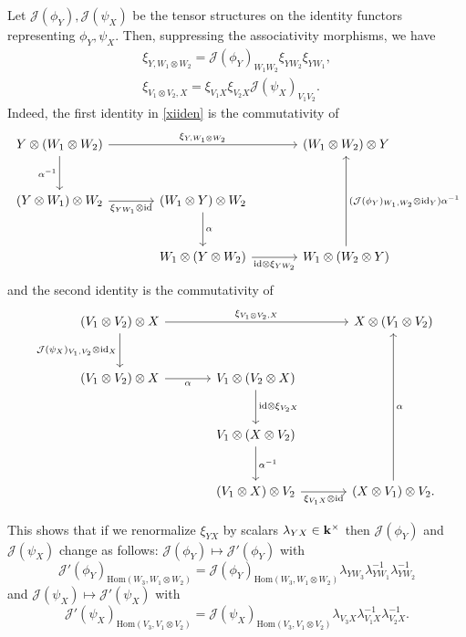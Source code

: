 \documentclass[12pt]{amsart}
\numberwithin{equation}{section}
\theoremstyle{definition}
\newcommand{\id}{\text{id}}
\newcommand{\Hom}{\text{Hom}}
\newcommand{\1}{_{(1)}}
\newcommand{\2}{_{(2)}}
\newcommand{\3}{_{(3)}}
\newcommand{\4}{_{(4)}}
\newcommand{\5}{_{(5)}}
\newcommand{\6}{_{(6)}}
\theoremstyle{plain}
\theoremstyle{definition}
\theoremstyle{remark}
\def\Hom{\mathrm{Hom}}
\begin{document}
Let $\mathcal J(\phi_Y),\mathcal J(\psi_X)$ be the tensor structures on the identity functors representing $\phi_Y,\psi_X$. 
Then, suppressing the associativity morphisms, we have
\begin{equation} \label{xiiden}
\begin{aligned} 
\xi_{Y,W_1\otimes W_2}=\mathcal J(\phi_Y)_{W_1W_2}\xi_{YW_2}\xi_{YW_1},\\
\xi_{V_1\otimes V_2,X}=\xi_{V_1X}\xi_{V_2X}\mathcal J(\psi_X)_{V_1V_2}.
\end{aligned}
\end{equation}
Indeed, the first identity in \eqref{xiiden} is the commutativity of
\[
\begin{tikzcd}[column sep=large,row sep=large]
Y\otimes (W_1\otimes W_2) \arrow[rr,"{\xi_{Y,W_1\otimes W_2}}"] \arrow[d,"{\alpha^{-1}}"'] && (W_1\otimes W_2)\otimes Y \\
(Y\otimes W_1)\otimes W_2 \arrow[r,"{\xi_{YW_1}\otimes\id}"'] & (W_1\otimes Y)\otimes W_2 \arrow[d,"{\alpha}"] & \\
& W_1\otimes (Y\otimes W_2) \arrow[r,"{\id\otimes\xi_{YW_2}}"'] & W_1\otimes (W_2\otimes Y) \arrow[uu,"{(\mathcal J(\phi_Y)_{W_1,W_2}\otimes\id_Y)\alpha^{-1}}"']
\end{tikzcd}
\]
and the second identity is the commutativity of
\[
\begin{tikzcd}[column sep=large,row sep=large]
(V_1\otimes V_2)\otimes X \arrow[rr,"{\xi_{V_1\otimes V_2,X}}"] \arrow[d,"{\mathcal J(\psi_X)_{V_1,V_2}\otimes\id_X}"'] && X\otimes (V_1\otimes V_2) \\
(V_1\otimes V_2)\otimes X \arrow[r,"{\alpha}"'] & V_1\otimes (V_2\otimes X) \arrow[d,"{\id\otimes\xi_{V_2X}}"] & \\
& V_1\otimes (X\otimes V_2) \arrow[d,"{\alpha^{-1}}"] & \\
& (V_1\otimes X)\otimes V_2 \arrow[r,"{\xi_{V_1X}\otimes\id}"'] & (X\otimes V_1)\otimes V_2 \arrow[uuu,"{\alpha}"'].
\end{tikzcd}
\]

This shows that if we renormalize $\xi_{YX}$ by scalars $\lambda_{YX}\in \bold k^\times$ 
then $\mathcal J(\phi_Y)$ and $\mathcal J(\psi_X)$ change as follows: 
$\mathcal J(\phi_Y)\mapsto \mathcal J'(\phi_Y)$ with 
\begin{equation}\label{tran1} 
\mathcal J'(\phi_Y)_{\Hom(W_3,W_1\otimes W_2)}=\mathcal J(\phi_Y)_{\Hom(W_3,W_1\otimes W_2)}\lambda_{YW_3}\lambda_{YW_1}^{-1}\lambda_{YW_2}^{-1}
\end{equation}
and 
$\mathcal J(\psi_X)\mapsto \mathcal J'(\psi_X)$ with 
\begin{equation}\label{tran2} 
\mathcal J'(\psi_X)_{\Hom(V_3,V_1\otimes V_2)}=\mathcal J(\psi_X)_{\Hom(V_3,V_1\otimes V_2)}\lambda_{V_3X}\lambda_{V_1X}^{-1}\lambda_{V_2X}^{-1}.
\end{equation}
\end{document}
